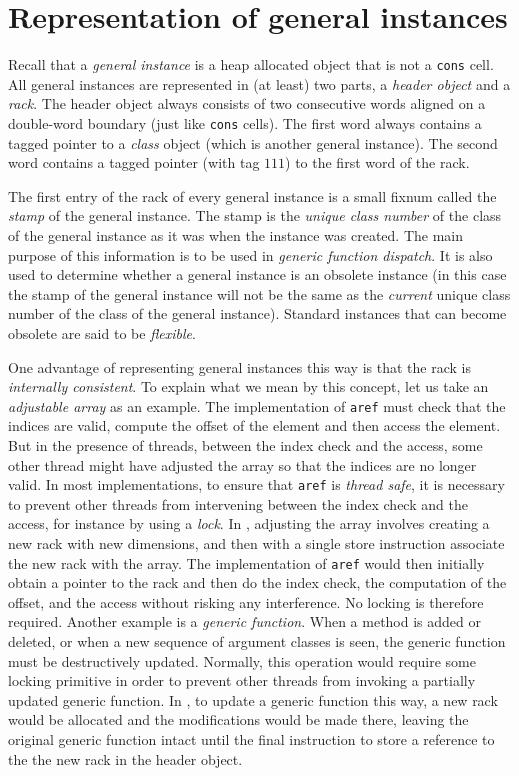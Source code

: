 \section{Representation of general instances}
\label{sec-data-representation-general-instances}

Recall that a \emph{general instance} is a heap allocated object that
is not a \texttt{cons} cell.  All general instances are represented in
(at least) two parts, a \emph{header object} and a \emph{rack}.  The
header object always consists of two consecutive words aligned on a
double-word boundary (just like \texttt{cons} cells).  The first word
always contains a tagged pointer to a \emph{class} object (which is
another general instance).  The second word contains a tagged pointer
(with tag $111$) to the first word of the rack.

The first entry of the rack of every general instance is a
small fixnum called the \emph{stamp} of the general instance.  The
stamp is the \emph{unique class number} of the class of the general
instance as it was when the instance was created.  The main purpose of
this information is to be used in \emph{generic function dispatch}.
It is also used to determine whether a general instance is an obsolete
instance (in this case the stamp of the general instance will not be
the same as the \emph{current} unique class number of the class of the
general instance).  Standard instances that can become obsolete are
said to be \emph{flexible}.

One advantage of representing general instances this way is that the
rack is \emph{internally consistent}.  To explain what we
mean by this concept, let us take an \emph{adjustable array} as an
example.  The implementation of \texttt{aref} must check that the
indices are valid, compute the offset of the element and then access
the element.  But in the presence of threads, between the index check
and the access, some other thread might have adjusted the array so
that the indices are no longer valid.  In most implementations, to
ensure that \texttt{aref} is \emph{thread safe}, it is necessary to
prevent other threads from intervening between the index check and the
access, for instance by using a \emph{lock}.  In \sysname{}, adjusting
the array involves creating a new rack with new dimensions,
and then with a single store instruction associate the new rack
with the array.  The implementation of \texttt{aref} would then
initially obtain a pointer to the rack and then do the
index check, the computation of the offset, and the access without
risking any interference.  No locking is therefore required.  Another
example is a \emph{generic function}.  When a method is added or
deleted, or when a new sequence of argument classes is seen, the
generic function must be destructively updated.  Normally, this
operation would require some locking primitive in order to prevent
other threads from invoking a partially updated generic function.  In
\sysname{}, to update a generic function this way, a new rack
would be allocated and the modifications would be made there,
leaving the original generic function intact until the final
instruction to store a reference to the the new rack in the
header object.

